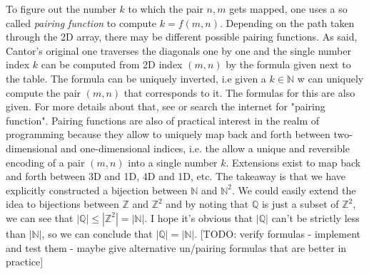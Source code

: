 To figure out the number $k$ to which the pair $n,m$ gets mapped, one uses a so called \emph{pairing function} to compute $k = f(m,n)$. Depending on the path taken through the 2D array, there may be different possible pairing functions. As said, Cantor's original one traverses the diagonals one by one and the single number index $k$ can be computed from 2D index $(m,n)$ by the formula given next to the table. The formula can be uniquely inverted, i.e given a $k \in \mathbb{N}$ w can uniquely compute the pair $(m,n)$ that corresponds to it. The formulas for this are also given. For more details about that, see \cite{WK_PairingFunction} or search the internet for "pairing function". Pairing functions are also of practical interest in the realm of programming because they allow to uniquely map back and forth between two-dimensional and one-dimensional indices, i.e. the allow a unique and reversible encoding of a pair $(m,n)$ into a single number $k$. Extensions exist to map back and forth between 3D and 1D, 4D and 1D, etc. The takeaway is that we have explicitly constructed a bijection between $\mathbb{N}$ and $\mathbb{N}^2$. We could easily extend the idea to bijections between $\mathbb{Z}$ and $\mathbb{Z}^2$ and by noting that $\mathbb{Q}$ is just a subset of $\mathbb{Z}^2$, we can see that $|\mathbb{Q}| \leq |\mathbb{Z}^2| = |\mathbb{N}|$. I hope it's obvious that $|\mathbb{Q}|$ can't be strictly less than $|\mathbb{N}|$, so we can conclude that $|\mathbb{Q}| = |\mathbb{N}|$. [TODO: verify formulas - implement and test them - maybe give alternative un/pairing formulas that are better in practice]



